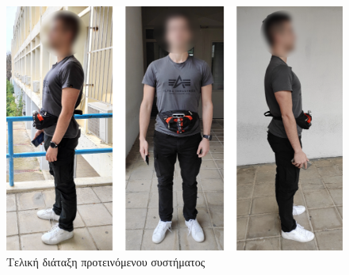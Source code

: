 \begin{figure}[H]
    \centering
    \includegraphics[width=\textwidth]{images/final-version.png}
    \caption{Τελική διάταξη προτεινόμενου συστήματος}
    \label{fig:final-version}
\end{figure}